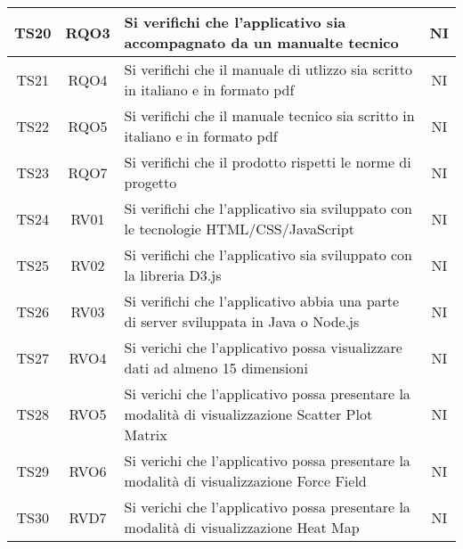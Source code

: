 \documentclass[../piano_di_qualifica.tex]{subfiles}
\begin{document}
\begin{center}
\begin{longtable}{|c|c|p{8.5cm}|c|}
		TS20              & RQO3                   & Si verifichi che l'applicativo sia accompagnato da un manualte tecnico                                                 & NI                         \\ \hline
		TS21              & RQO4                   & Si verifichi che il manuale di utlizzo sia scritto in italiano e in formato pdf                                        & NI                         \\ \hline
		TS22              & RQO5                   & Si verifichi che il manuale tecnico sia scritto in italiano e in formato pdf                                           & NI                         \\ \hline
		TS23              & RQO7                   & Si verifichi che il prodotto rispetti le norme di progetto                                                             & NI                         \\   \hline
		TS24              & RV01                   & Si verifichi che l'applicativo sia sviluppato con le tecnologie HTML/CSS/JavaScript                                    & NI                         \\ \hline
		TS25              & RV02                   & Si verifichi che l'applicativo sia sviluppato con la libreria D3.js                                                    & NI                         \\ \hline
		TS26              & RV03                   & Si verifichi che l'applicativo abbia una parte di server sviluppata in Java o Node.js                                  & NI                         \\ \hline
		TS27              & RVO4                   & Si verichi che l’applicativo possa visualizzare dati ad almeno 15 dimensioni                                           & NI                         \\ \hline
		TS28              & RVO5                   & Si verichi che l’applicativo possa presentare la modalità di visualizzazione Scatter Plot Matrix                       & NI                         \\ \hline
		TS29              & RVO6                   & Si verichi che l’applicativo possa presentare la modalità di visualizzazione Force Field                               & NI                         \\ \hline
		TS30              & RVD7                   & Si verichi che l’applicativo possa presentare la modalità di visualizzazione Heat Map                                  & NI                         \\ \hline

\end{longtable}
\end{center}
\end{document}
